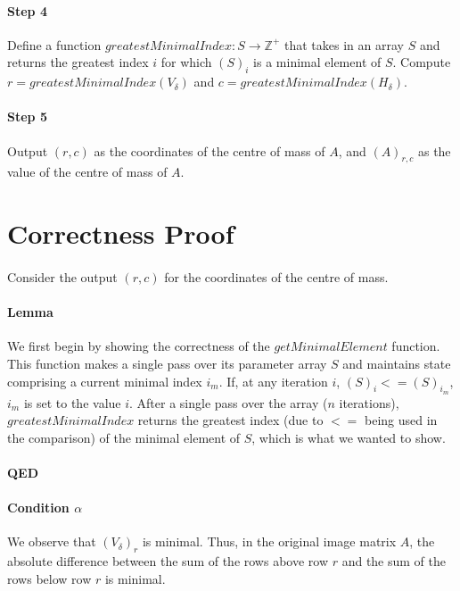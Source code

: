 \documentclass[]{article}
\begin{document}
		\paragraph{Step 4}
		Define a function $greatestMinimalIndex: S \to \mathbb{Z}^+$ that takes in an array $S$ and returns the greatest index $i$ for which $(S)_i$ is a minimal element of $S$. Compute $r = greatestMinimalIndex(V_\delta)$ and $c = greatestMinimalIndex(H_\delta)$.
		
		\paragraph{Step 5}
		Output $(r,c)$ as the coordinates of the centre of mass of $A$, and $(A)_{r,c}$ as the value of the centre of mass of $A$.
			
	
	\section{Correctness Proof}
		\paragraph{}
		Consider the output $(r,c)$ for the coordinates of the centre of mass.
		
		\paragraph{Lemma}
		We first begin by showing the correctness of the $getMinimalElement$ function. This function makes a single pass over its parameter array $S$ and maintains state comprising a current minimal index $i_m$. If, at any iteration $i$, $(S)_i <= (S)_{i_m}$, $i_m$ is set to the value $i$. After a single pass over the array ($n$ iterations), $greatestMinimalIndex$ returns the greatest index (due to $<=$ being used in the comparison) of the minimal element of $S$, which is what we wanted to show. 
		
		\paragraph{QED}
		
		\paragraph{Condition $\alpha$}
		We observe that $(V_\delta)_r$ is minimal. Thus, in the original image matrix $A$, the absolute difference between the sum of the rows above row $r$ and the sum of the rows below row $r$ is minimal.
		
\end{document}
